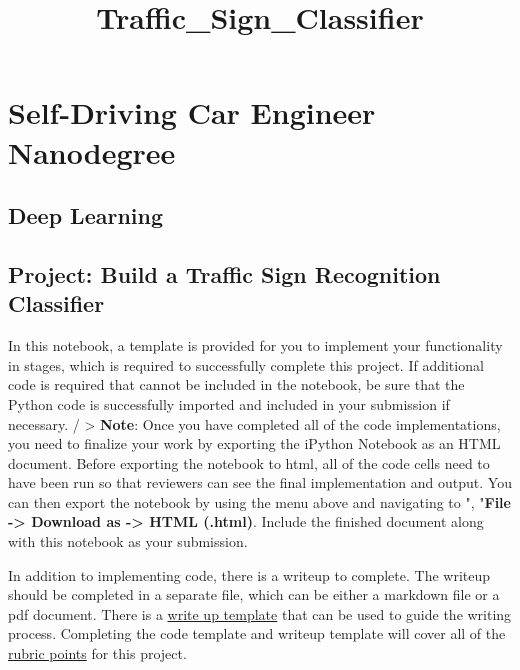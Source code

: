 \documentclass[11pt]{article}
\title{Traffic\_Sign\_Classifier}
\begin{document}
    
    
    \maketitle
    
    

    
    \section{Self-Driving Car Engineer
Nanodegree}\label{self-driving-car-engineer-nanodegree}

\subsection{Deep Learning}\label{deep-learning}

\subsection{Project: Build a Traffic Sign Recognition
Classifier}\label{project-build-a-traffic-sign-recognition-classifier}

In this notebook, a template is provided for you to implement your
functionality in stages, which is required to successfully complete this
project. If additional code is required that cannot be included in the
notebook, be sure that the Python code is successfully imported and
included in your submission if necessary. / \textgreater{}
\textbf{Note}: Once you have completed all of the code implementations,
you need to finalize your work by exporting the iPython Notebook as an
HTML document. Before exporting the notebook to html, all of the code
cells need to have been run so that reviewers can see the final
implementation and output. You can then export the notebook by using the
menu above and navigating to \n", "\textbf{File -\textgreater{} Download
as -\textgreater{} HTML (.html)}. Include the finished document along
with this notebook as your submission.

In addition to implementing code, there is a writeup to complete. The
writeup should be completed in a separate file, which can be either a
markdown file or a pdf document. There is a
\href{https://github.com/udacity/CarND-Traffic-Sign-Classifier-Project/blob/master/writeup_template.md}{write
up template} that can be used to guide the writing process. Completing
the code template and writeup template will cover all of the
\href{https://review.udacity.com/\#!/rubrics/481/view}{rubric points}
for this project.
\end{document}
